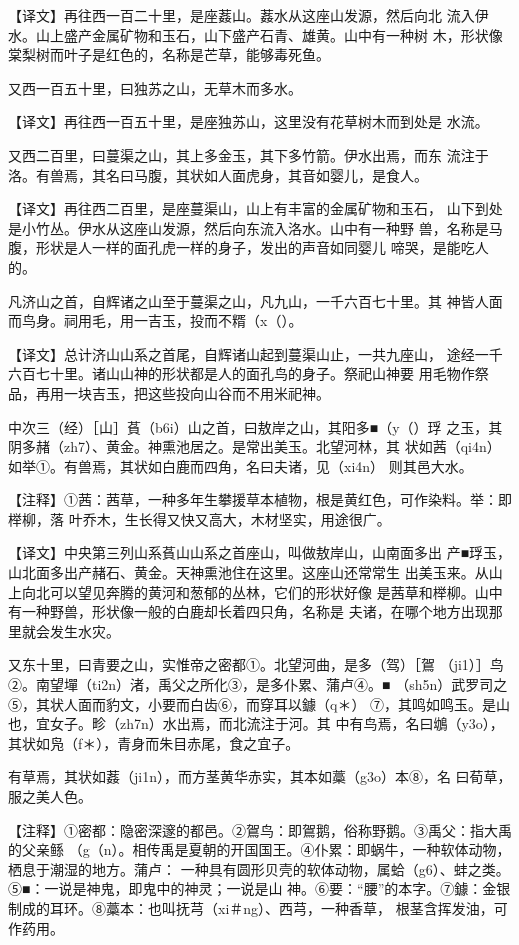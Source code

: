 \documentclass[a4paper,12pt,UTF8,twoside]{ctexbook}
\begin{document}
【译文】再往西一百二十里，是座葌山。葌水从这座山发源，然后向北 流入伊水。山上盛产金属矿物和玉石，山下盛产石青、雄黄。山中有一种树 木，形状像棠梨树而叶子是红色的，名称是芒草，能够毒死鱼。

又西一百五十里，曰独苏之山，无草木而多水。

【译文】再往西一百五十里，是座独苏山，这里没有花草树木而到处是 水流。

又西二百里，曰蔓渠之山，其上多金玉，其下多竹箭。伊水出焉，而东 流注于洛。有兽焉，其名曰马腹，其状如人面虎身，其音如婴儿，是食人。

【译文】再往西二百里，是座蔓渠山，山上有丰富的金属矿物和玉石， 山下到处是小竹丛。伊水从这座山发源，然后向东流入洛水。山中有一种野 兽，名称是马腹，形状是人一样的面孔虎一样的身子，发出的声音如同婴儿 啼哭，是能吃人的。

凡济山之首，自辉诸之山至于蔓渠之山，凡九山，一千六百七十里。其 神皆人面而鸟身。祠用毛，用一吉玉，投而不糈（x（）。

【译文】总计济山山系之首尾，自辉诸山起到蔓渠山止，一共九座山， 途经一千六百七十里。诸山山神的形状都是人的面孔鸟的身子。祭祀山神要 用毛物作祭品，再用一块吉玉，把这些投向山谷而不用米祀神。

中次三（经）［山］萯（b6i）山之首，曰敖岸之山，其阳多■（y（）琈 之玉，其阴多赭（zh7）、黄金。神熏池居之。是常出美玉。北望河林，其 状如茜（qi4n）如举①。有兽焉，其状如白鹿而四角，名曰夫诸，见（xi4n） 则其邑大水。

【注释】①茜：茜草，一种多年生攀援草本植物，根是黄红色，可作染料。举：即榉柳，落 叶乔木，生长得又快又高大，木材坚实，用途很广。

【译文】中央第三列山系萯山山系之首座山，叫做敖岸山，山南面多出 产■琈玉，山北面多出产赭石、黄金。天神熏池住在这里。这座山还常常生 出美玉来。从山上向北可以望见奔腾的黄河和葱郁的丛林，它们的形状好像 是茜草和榉柳。山中有一种野兽，形状像一般的白鹿却长着四只角，名称是 夫诸，在哪个地方出现那里就会发生水灾。

又东十里，曰青要之山，实惟帝之密都①。北望河曲，是多（驾）［鴐 （ji1）］鸟②。南望墠（ti2n）渚，禹父之所化③，是多仆累、蒲卢④。■ （sh5n）武罗司之⑤，其状人面而豹文，小要而白齿⑥，而穿耳以鐻（q＊） ⑦，其鸣如鸣玉。是山也，宜女子。畛（zh7n）水出焉，而北流注于河。其 中有鸟焉，名曰鴢（y3o），其状如凫（f＊），青身而朱目赤尾，食之宜子。

有草焉，其状如葌（ji1n），而方茎黄华赤实，其本如藁（g3o）本⑧，名 曰荀草，服之美人色。

【注释】①密都：隐密深邃的都邑。②鴐鸟：即鴐鹅，俗称野鹅。③禹父：指大禹的父亲鲧 （g（n）。相传禹是夏朝的开国国王。④仆累：即蜗牛，一种软体动物，栖息于潮湿的地方。蒲卢： 一种具有圆形贝壳的软体动物，属蛤（g6）、蚌之类。⑤■：一说是神鬼，即鬼中的神灵；一说是山 神。⑥要：“腰”的本字。⑦鐻：金银制成的耳环。⑧藁本：也叫抚芎（xi＃ng）、西芎，一种香草， 根茎含挥发油，可作药用。
\end{document}
